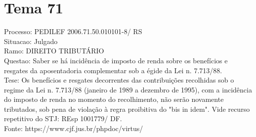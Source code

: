 \documentclass[12pt]{article}
\begin{document}
\section*{Tema 71}
Processo: PEDILEF 2006.71.50.010101-8/ RS\\
Situacao: Julgado\\
Ramo: DIREITO TRIBUTÁRIO\\
Questao: Saber se há incidência de imposto de renda sobre os benefícios e resgates da aposentadoria complementar sob a égide da Lei n. 7.713/88.\\
Tese: Os benefícios e resgates decorrentes das contribuições recolhidas sob o regime da Lei n. 7.713/88 (janeiro de 1989 a dezembro de 1995), com a incidência do imposto de renda no momento do recolhimento, não serão novamente tributados, sob pena de violação à regra proibitiva do "bis in idem". Vide recurso repetitivo do STJ: REsp 1001779/ DF.\\
Fonte: https://www.cjf.jus.br/phpdoc/virtus/
\end{document}
